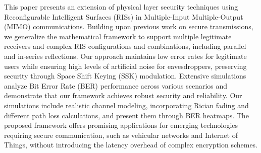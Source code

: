 This paper presents an extension of physical layer security techniques using Reconfigurable Intelligent Surfaces (RISs) in Multiple-Input Multiple-Output (MIMO) communications. Building upon previous work on secure transmissions, we generalize the mathematical framework to support multiple legitimate receivers and complex RIS configurations and combinations, including parallel and in-series reflections. Our approach maintains low error rates for legitimate users while ensuring high levels of artificial noise for eavesdroppers, preserving security through Space Shift Keying (SSK) modulation. Extensive simulations analyze Bit Error Rate (BER) performance across various scenarios and demonstrate that our framework achieves robust security and reliability. Our simulations include realistic channel modeling, incorporating Rician fading and different path loss calculations, and present them through BER heatmaps. The proposed framework offers promising applications for emerging technologies requiring secure communication, such as vehicular networks and Internet of Things, without introducing the latency overhead of complex encryption schemes.
